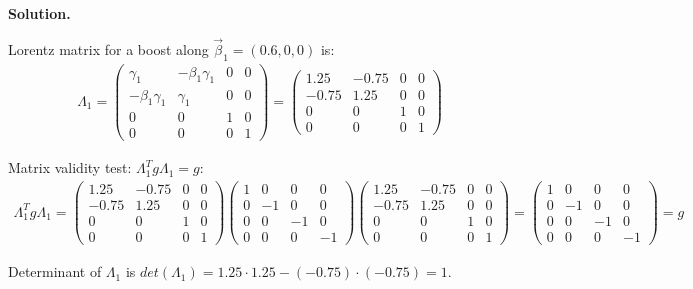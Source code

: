 \documentclass[11pt,a4paper]{article}
\newenvironment{solution}{\vspace{1cm} \par\textbf{Solution.} \vspace{1cm}}{\newpage}
\begin{document}
\begin{solution}

Lorentz matrix for a boost along $\vec{\beta}_1 = (0.6,0,0)$ is:
\begin{align*}
  \Lambda_1 = \begin{pmatrix}
    \gamma_1 & -\beta_1 \gamma_1 & 0 & 0 \\
    -\beta_1 \gamma_1 & \gamma_1 & 0 & 0 \\
    0 & 0 & 1 & 0 \\
    0 & 0 & 0 & 1
  \end{pmatrix} = \begin{pmatrix}
    1.25 & -0.75 & 0 & 0 \\
    -0.75 & 1.25 & 0 & 0 \\
    0 & 0 & 1 & 0 \\
    0 & 0 & 0 & 1
  \end{pmatrix}
\end{align*}

Matrix validity test: $\Lambda_1^T g \Lambda_1 = g$:
\begin{align*}
  \Lambda_1^T g \Lambda_1 = \begin{pmatrix}
    1.25 & -0.75 & 0 & 0 \\
    -0.75 & 1.25 & 0 & 0 \\
    0 & 0 & 1 & 0 \\
    0 & 0 & 0 & 1
  \end{pmatrix} \begin{pmatrix}
    1 & 0 & 0 & 0 \\
    0 & -1 & 0 & 0 \\
    0 & 0 & -1 & 0 \\
    0 & 0 & 0 & -1
  \end{pmatrix} \begin{pmatrix}
    1.25 & -0.75 & 0 & 0 \\
    -0.75 & 1.25 & 0 & 0 \\
    0 & 0 & 1 & 0 \\
    0 & 0 & 0 & 1
  \end{pmatrix} = \begin{pmatrix}
    1 & 0 & 0 & 0 \\
    0 & -1 & 0 & 0 \\
    0 & 0 & -1 & 0 \\
    0 & 0 & 0 & -1
  \end{pmatrix} = g
\end{align*}

Determinant of $\Lambda_1$ is $det(\Lambda_1) = 1.25 \cdot 1.25 - (-0.75) \cdot (-0.75) = 1$.



\end{solution}
\end{document}
